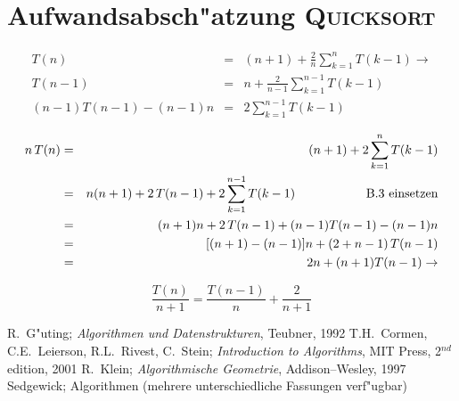 \documentclass[draft,12pt]{scrreprt}
\theoremstyle{break}
\begin{document}
\section{Aufwandsabsch"atzung \textsc{Quicksort}}
\label{quicksort}

\begin{eqnarray}
T(n) & = & (n+1)+ \frac{2}{n} \sum_{k=1}^nT(k-1) \rightarrow\\
T(n-1) & = & n+\frac{2}{n-1} \sum_{k=1}^{n-1}T(k-1)\\
(n-1)T(n-1) - (n-1)n & = & 2\sum_{k=1}^{n-1}T(k-1)
\end{eqnarray}

\begin{eqnarray*}
n\, T(n) & = & (n+1)+ 2 \sum_{k=1}^nT(k-1)\\
& = & n(n+1)+2\, T(n-1) +2 \sum_{k=1}^{n-1}T(k-1) \hspace{2cm} \textup{B.3 einsetzen}\\
& = & (n+1)n+2\, T(n-1) + (n-1)T(n-1) -(n-1)n\\
& = & [(n+1)-(n-1)]n+(2+n-1)\, T(n-1)\\
& = & 2n+(n+1)T(n-1) \rightarrow 
\end{eqnarray*}

\begin{displaymath}
\frac{T(n)}{n+1}= \frac{T(n-1)}{n}+ \frac{2}{n+1}	
\end{displaymath}

\begin{thebibliography}{99}
R.~G"uting; \textit{Algorithmen und Datenstrukturen}, Teubner, 1992
T.H.~Cormen, C.E.~Leierson, R.L.~Rivest, C.~Stein; \textit{Introduction to Algorithms}, MIT Press, 2$^{nd}$ edition, 2001
R.~Klein; \textit{Algorithmische Geometrie}, Addison--Wesley, 1997
Sedgewick; Algorithmen (mehrere unterschiedliche Fassungen verf"ugbar)
\end{thebibliography}
\end{document}
